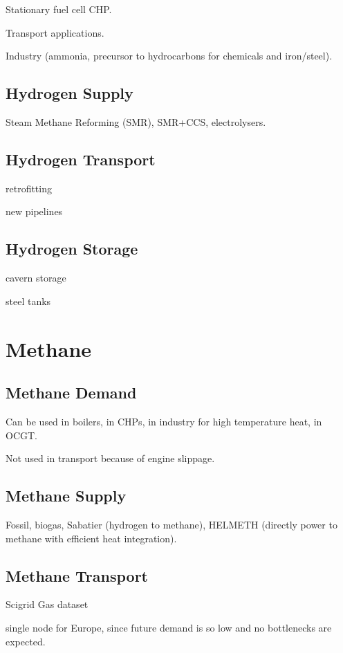 Stationary fuel cell CHP.

Transport applications.

Industry (ammonia, precursor to hydrocarbons for chemicals and iron/steel).

\subsection{Hydrogen Supply}

Steam Methane Reforming (SMR), SMR+CCS, electrolysers.

\subsection{Hydrogen Transport}

retrofitting

new pipelines

\subsection{Hydrogen Storage}

cavern storage

steel tanks

\section{Methane}

\subsection{Methane Demand}

Can be used in boilers, in CHPs, in industry for high temperature heat, in OCGT.

Not used in transport because of engine slippage.

\subsection{Methane Supply}

Fossil, biogas, Sabatier (hydrogen to methane), HELMETH (directly power to
methane with efficient heat integration).

\subsection{Methane Transport}

Scigrid Gas dataset

single node for Europe, since future demand is so low and no bottlenecks are expected.

